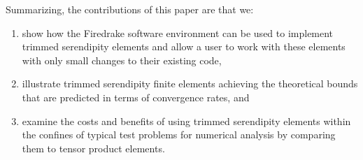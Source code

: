 \documentclass[format=acmsmall,screen,timestamp=false,a4paper]{acmart}
\newcommand{\calS}{\mathcal{S}}
\begin{document}
   
  
  
  
  
Summarizing, the contributions of this paper are that we:
\begin{enumerate}
\item show how the Firedrake software environment can be used to implement trimmed serendipity elements and allow a user to work with these elements with only small changes to their existing code, 
\item illustrate trimmed serendipity finite elements achieving the theoretical bounds that are predicted in terms of convergence rates, and  
\item examine the costs and benefits of using trimmed serendipity elements within the confines of typical test problems for numerical analysis by comparing them to tensor product elements.
\end{enumerate}
  
\end{document}
